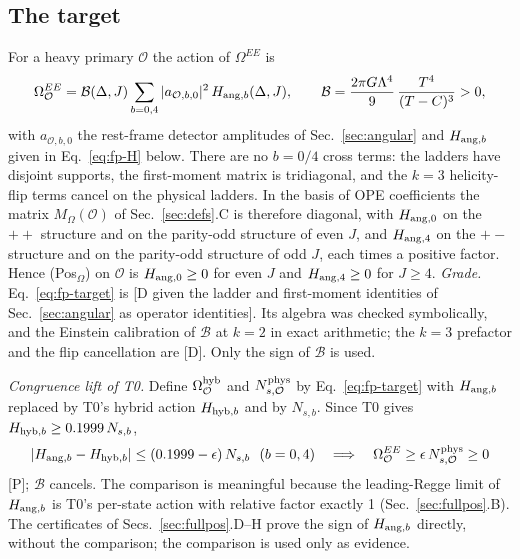 \subsection{The target}
For a heavy primary $\mathcal O$ the action of $\Omega^{EE}$ is
\begin{equation}
\Omega^{EE}_{\mathcal O}=\mathcal B(\Delta,J)\sum_{b=0,4}|a_{\mathcal O,b,0}|^2\,H_{{\rm ang},b}(\Delta,J),\qquad
\mathcal B=\frac{2\pi G\Lambda^4}{9}\,\frac{T^4}{(T-C)^3}>0,
\label{eq:fp-target}
\end{equation}
with $a_{\mathcal O,b,0}$ the rest-frame detector amplitudes of Sec.~\ref{sec:angular} and $H_{{\rm ang},b}$ given in
Eq.~\eqref{eq:fp-H} below. There are no $b=0/4$ cross terms: the ladders have disjoint supports, the first-moment matrix is
tridiagonal, and the $k=3$ helicity-flip terms cancel on the physical ladders. In the basis of OPE coefficients the matrix
$M_\Omega(\mathcal O)$ of Sec.~\ref{sec:defs}.C is therefore diagonal, with $H_{{\rm ang},0}$ on the $++$ structure and on the
parity-odd structure of even $J$, and $H_{{\rm ang},4}$ on the $+-$ structure and on the parity-odd structure of odd $J$, each times a
positive factor. Hence (Pos$_\Omega$) on $\mathcal O$ is $H_{{\rm ang},0}\ge0$ for even $J$ and $H_{{\rm ang},4}\ge0$ for $J\ge4$.
\emph{Grade.} Eq.~\eqref{eq:fp-target} is [D given the ladder and first-moment identities of Sec.~\ref{sec:angular} as operator
identities]. Its algebra was checked symbolically, and the Einstein calibration of $\mathcal B$ at $k=2$ in exact arithmetic; the
$k=3$ prefactor and the flip cancellation are [D]. Only the sign of $\mathcal B$ is used.

\emph{Congruence lift of T0.} Define $\Omega^{\rm hyb}_{\mathcal O}$ and $N^{\rm phys}_{s,\mathcal O}$ by
Eq.~\eqref{eq:fp-target} with $H_{{\rm ang},b}$ replaced by T0's hybrid action $H_{{\rm hyb},b}$ and by $N_{s,b}$. Since T0 gives
$H_{{\rm hyb},b}\ge0.1999\,N_{s,b}$,
\begin{equation}
|H_{{\rm ang},b}-H_{{\rm hyb},b}|\le(0.1999-\epsilon)\,N_{s,b}\ \ (b=0,4)\quad\Longrightarrow\quad
\Omega^{EE}_{\mathcal O}\ge\epsilon\,N^{\rm phys}_{s,\mathcal O}\ge0
\label{eq:fp-lift}
\end{equation}
[P]; $\mathcal B$ cancels. The comparison is meaningful because the leading-Regge limit of $H_{{\rm ang},b}$ is T0's per-state
action with relative factor exactly 1 (Sec.~\ref{sec:fullpos}.B). The certificates of Secs.~\ref{sec:fullpos}.D--H prove the sign of
$H_{{\rm ang},b}$ directly, without the comparison; the comparison is used only as evidence.

